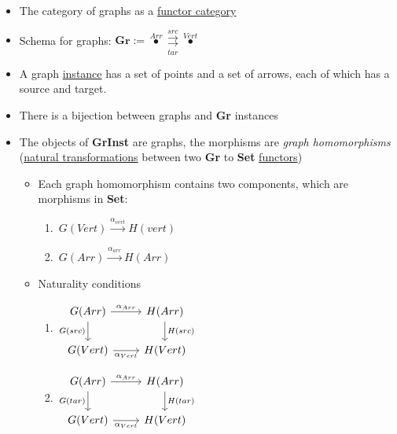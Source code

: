 \begin{itemize}
    \item The category of graphs as a \hyperref[D3.54]{functor category}
    \item Schema for graphs: $\mathbf{Gr}:=\boxed{\overset{Arr}\bullet \overset{src}{\underset{tar}{\rightrightarrows}}\overset{Vert}\bullet}$
    \item A graph \hyperref[D3.44]{instance} has a set of points and a set of arrows, each of which has a source and target.
    \item There is a bijection between graphs and \textbf{Gr} instances
    \item The objects of \textbf{GrInst} are graphs, the morphisms are \emph{graph homomorphisms} (\hyperref[D3.49]{natural transformations} between two \textbf{Gr} to \textbf{Set} \hyperref[D3.35]{functors})
          \begin{itemize}
            \item Each graph homomorphism contains two components, which are morphisms in \textbf{Set}:
                  \begin{enumerate}
                    \item \,$G(Vert) \xrightarrow{\alpha_{vert}} H(vert)$\,
                    \item \,$G(Arr) \xrightarrow{\alpha_{arr}} H(Arr)$\,
                  \end{enumerate}
            \item Naturality conditions
                  \begin{enumerate}
                    \item $\begin{tikzcd}G(Arr) \arrow[r, "\alpha_{Arr}"] \arrow[d, "G(src)"'] & H(Arr) \arrow[d, "H(src)"] \\G(Vert) \arrow[r, "\alpha_{Vert}"']                   & H(Vert)                   \end{tikzcd}$
                    \item $\begin{tikzcd}G(Arr) \arrow[r, "\alpha_{Arr}"] \arrow[d, "G(tar)"'] & H(Arr) \arrow[d, "H(tar)"] \\G(Vert) \arrow[r, "\alpha_{Vert}"']                   & H(Vert)                   \end{tikzcd}$
                  \end{enumerate}
          \end{itemize}
  \end{itemize}
